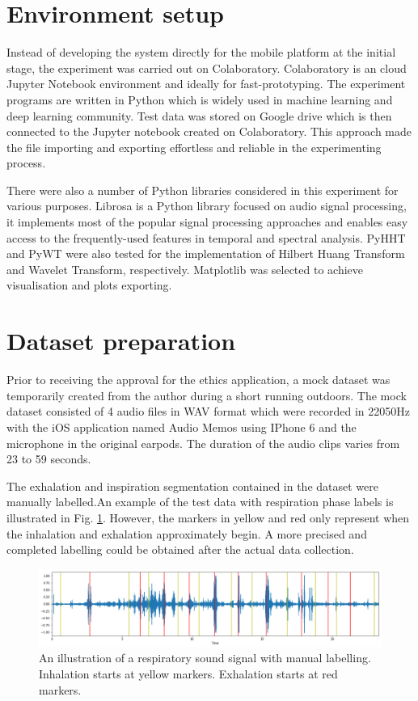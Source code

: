 \section{Environment setup}
Instead of developing the system directly for the mobile platform at the initial stage, the experiment was carried out on Colaboratory. Colaboratory is an cloud Jupyter Notebook environment and ideally for fast-prototyping. The experiment programs are written in Python which is widely used in machine learning and deep learning community. Test data was stored on Google drive which is then connected to the Jupyter notebook created on Colaboratory. This approach made the file importing and exporting effortless and reliable in the experimenting process. 

There were also a number of Python libraries considered in this experiment for various purposes. Librosa is a Python library focused on audio signal processing, it implements most of the popular signal processing approaches and enables easy access to the frequently-used features in temporal and spectral analysis. PyHHT and PyWT were also tested for the implementation of Hilbert Huang Transform and Wavelet Transform, respectively. Matplotlib was selected to achieve visualisation and plots exporting. 

\section{Dataset preparation}
Prior to receiving the approval for the ethics application, a mock dataset was temporarily created from the author during a short running outdoors. The mock dataset consisted of 4 audio files in WAV format which were recorded in 22050Hz with the iOS application named Audio Memos using IPhone 6 and the microphone in the original earpods. The duration of the audio clips varies from 23 to 59 seconds.

The exhalation and inspiration segmentation contained in the dataset were manually labelled.An example of the test data with respiration phase labels is illustrated in Fig. \ref{fig:audio_waveform}. However, the markers in yellow and red only represent when the inhalation and exhalation approximately begin. A more precised and completed labelling could be obtained after the actual data collection.

\begin{figure}[h]
    \centerline{\includegraphics[scale=0.35]{figures/audio_waveform.png}}
    \caption{An illustration of a respiratory sound signal with manual labelling. Inhalation starts at yellow markers. Exhalation starts at red markers.}
    \label{fig:audio_waveform}
\end{figure}


